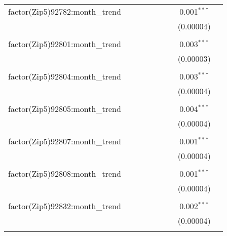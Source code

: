 \begin{table}[H]
{\begin{tabular}{@{\extracolsep{5pt}}lcccccccc}
  factor(Zip5)92782:month\_trend &  &  &  &  &  &  & 0.001$^{***}$ &  \\  

   &  &  &  &  &  &  & (0.00004) &  \\  

   & & & & & & & & \\  

  factor(Zip5)92801:month\_trend &  &  &  &  &  &  & 0.003$^{***}$ &  \\  

   &  &  &  &  &  &  & (0.00003) &  \\  

   & & & & & & & & \\  

  factor(Zip5)92804:month\_trend &  &  &  &  &  &  & 0.003$^{***}$ &  \\  

   &  &  &  &  &  &  & (0.00004) &  \\  

   & & & & & & & & \\  

  factor(Zip5)92805:month\_trend &  &  &  &  &  &  & 0.004$^{***}$ &  \\  

   &  &  &  &  &  &  & (0.00004) &  \\  

   & & & & & & & & \\  

  factor(Zip5)92807:month\_trend &  &  &  &  &  &  & 0.001$^{***}$ &  \\  

   &  &  &  &  &  &  & (0.00004) &  \\  

   & & & & & & & & \\  

  factor(Zip5)92808:month\_trend &  &  &  &  &  &  & 0.001$^{***}$ &  \\  

   &  &  &  &  &  &  & (0.00004) &  \\  

   & & & & & & & & \\  

  factor(Zip5)92832:month\_trend &  &  &  &  &  &  & 0.002$^{***}$ &  \\  

   &  &  &  &  &  &  & (0.00004) &  \\  

   & & & & & & & & \\  


\end{tabular}}
\end{table}
